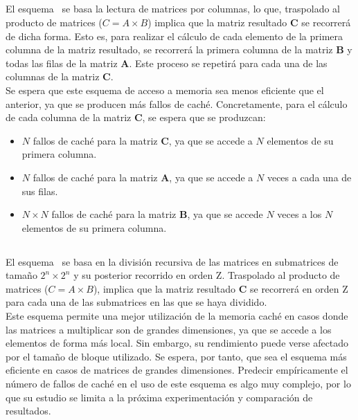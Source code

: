 \subsection{\colmajor}
El esquema \colmajor\ se basa la lectura de matrices por columnas, lo que, traspolado al producto de matrices (\( C = A \times B \))
implica que la matriz resultado \textbf{C} se recorrerá de dicha forma. Esto es, para realizar el cálculo de cada elemento de la primera columna de la matriz
resultado, se recorrerá la primera columna de la matriz \textbf{B} y todas las filas de la matriz \textbf{A}. Este proceso se repetirá para cada una
de las columnas de la matriz \textbf{C}. \\
Se espera que este esquema de acceso a memoria sea menos eficiente que el anterior, ya que se producen más fallos de caché. Concretamente,
para el cálculo de cada columna de la matriz \textbf{C}, se espera que se produzcan:
\begin{itemize}
    \item \(N\) fallos de caché para la matriz \textbf{C}, ya que se accede a \(N\) elementos de su primera columna.
    \item \(N\) fallos de caché para la matriz \textbf{A}, ya que se accede a \(N\) veces a cada una de sus filas.
    \item \(N \times N\) fallos de caché para la matriz \textbf{B}, ya que se accede \(N\) veces a los \(N\) elementos de su primera columna.
\end{itemize}

\subsection{\zorder}
El esquema \zorder\ se basa en la división recursiva de las matrices en submatrices de tamaño \(2^n \times 2^n\) y su posterior recorrido en orden Z.
Traspolado al producto de matrices (\( C = A \times B \)), implica que la matriz resultado \textbf{C} se recorrerá en orden Z para cada una 
de las submatrices en las que se haya dividido. \\
Este esquema permite una mejor utilización de la memoria caché en casos donde las matrices a multiplicar son de grandes dimensiones, 
ya que se accede a los elementos de forma más local. Sin embargo, su rendimiento puede verse afectado por el tamaño de bloque utilizado.
Se espera, por tanto, que sea el esquema más eficiente en casos de matrices de grandes dimensiones. Predecir empíricamente el número de fallos 
de caché en el uso de este esquema es algo muy complejo, por lo que su estudio se limita a la próxima experimentación y comparación de resultados.
